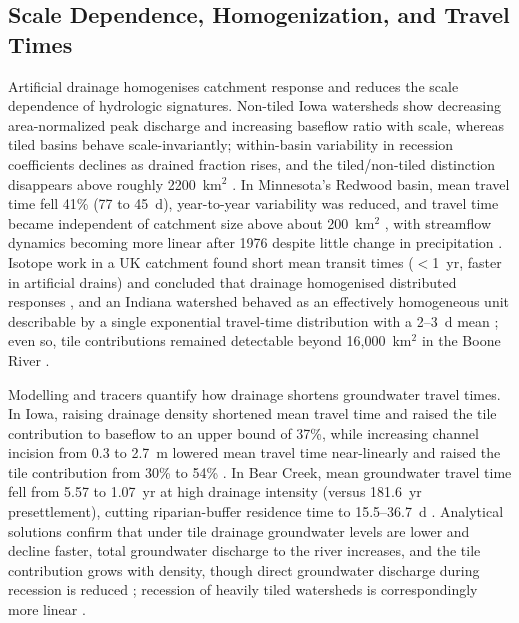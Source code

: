\documentclass[11pt]{article}
\begin{document}
\subsection{Scale Dependence, Homogenization, and Travel Times}

Artificial drainage homogenises catchment response and reduces the scale dependence of hydrologic signatures. Non-tiled Iowa watersheds show decreasing area-normalized peak discharge and increasing baseflow ratio with scale, whereas tiled basins behave scale-invariantly; within-basin variability in recession coefficients declines as drained fraction rises, and the tiled/non-tiled distinction disappears above roughly 2200~km$^2$ \parencite{BolandBrien2014}. In Minnesota's Redwood basin, mean travel time fell 41\% (77 to 45~d), year-to-year variability was reduced, and travel time became independent of catchment size above about 200~km$^2$ \parencite{DaneshYazdi2016}, with streamflow dynamics becoming more linear after 1976 despite little change in precipitation \parencite{FoufoulaGeorgiou2015}. Isotope work in a UK catchment found short mean transit times ($<$1~yr, faster in artificial drains) and concluded that drainage homogenised distributed responses \parencite{DimitrovaPetrova2020}, and an Indiana watershed behaved as an effectively homogeneous unit describable by a single exponential travel-time distribution with a 2--3~d mean \parencite{Basu2010}; even so, tile contributions remained detectable beyond 16{,}000~km$^2$ in the Boone River \parencite{Schilling2019}.

Modelling and tracers quantify how drainage shortens groundwater travel times. In Iowa, raising drainage density shortened mean travel time and raised the tile contribution to baseflow to an upper bound of 37\%, while increasing channel incision from 0.3 to 2.7~m lowered mean travel time near-linearly and raised the tile contribution from 30\% to 54\% \parencite{Schilling2012}. In Bear Creek, mean groundwater travel time fell from 5.57 to 1.07~yr at high drainage intensity (versus 181.6~yr presettlement), cutting riparian-buffer residence time to 15.5--36.7~d \parencite{Schilling2015}. Analytical solutions confirm that under tile drainage groundwater levels are lower and decline faster, total groundwater discharge to the river increases, and the tile contribution grows with density, though direct groundwater discharge during recession is reduced \parencite{Liang2015}; recession of heavily tiled watersheds is correspondingly more linear \parencite{Schilling2008}.
\end{document}
